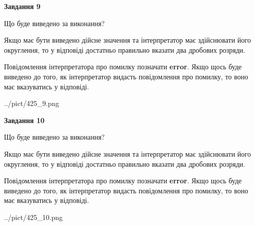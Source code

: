 \documentclass[12pt, ukrainian]{article}
\begin{document}
{\begin {Large}
{\begin {center}\textbf{Завдання 9}\end {center}}\par
Що буде виведено за виконання? \par

Якщо має бути виведено дійсне значення та інтерпретатор має здійснювати його округлення, 
то у відповіді достатньо правильно вказати два дробових розряди.

Повідомлення інтерпретатора про помилку позначати \textbf{error}.
Якщо щось буде виведено до того, як інтерпретатор видасть повідомлення про помилку, 
то воно має вказуватись у відповіді. \par

\begin{center}
	{../pict/425_9.png}
\end{center}
\newpage

{\begin {center}\textbf{Завдання 10}\end {center}}\par
Що буде виведено за виконання? \par

Якщо має бути виведено дійсне значення та інтерпретатор має здійснювати його округлення, 
то у відповіді достатньо правильно вказати два дробових розряди.

Повідомлення інтерпретатора про помилку позначати \textbf{error}.
Якщо щось буде виведено до того, як інтерпретатор видасть повідомлення про помилку, 
то воно має вказуватись у відповіді. \par

\begin{center}
	{../pict/425_10.png}
\end{center}
\newpage

\end {Large}}
\end{document}
